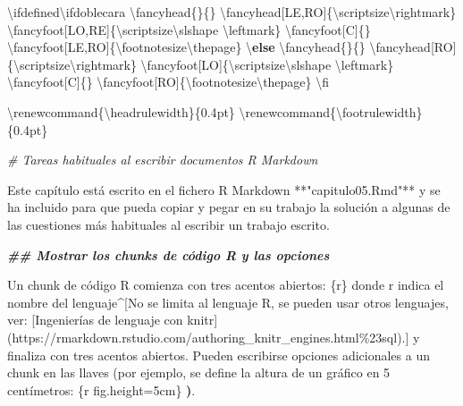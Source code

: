\documentclass[11pt,a4paper,oneside,]{article}
\newenvironment{Shaded}{\begin{snugshade}}{\end{snugshade}}
\newcommand{\AttributeTok}[1]{\textcolor[rgb]{0.77,0.63,0.00}{#1}}
\newcommand{\CommentTok}[1]{\textcolor[rgb]{0.56,0.35,0.01}{\textit{#1}}}
\newcommand{\ControlFlowTok}[1]{\textcolor[rgb]{0.13,0.29,0.53}{\textbf{#1}}}
\newcommand{\DocumentationTok}[1]{\textcolor[rgb]{0.56,0.35,0.01}{\textbf{\textit{#1}}}}
\newcommand{\ErrorTok}[1]{\textcolor[rgb]{0.64,0.00,0.00}{\textbf{#1}}}
\newcommand{\FloatTok}[1]{\textcolor[rgb]{0.00,0.00,0.81}{#1}}
\newcommand{\NormalTok}[1]{#1}
\newcommand{\OtherTok}[1]{\textcolor[rgb]{0.56,0.35,0.01}{#1}}
\newcommand{\SpecialCharTok}[1]{\textcolor[rgb]{0.00,0.00,0.00}{#1}}
\newcommand{\StringTok}[1]{\textcolor[rgb]{0.31,0.60,0.02}{#1}}
\numberwithin{dummy}{section}
\theoremstyle{ocrenumbox}
\theoremstyle{blacknumex}
\theoremstyle{blacknumbox}
\theoremstyle{ocrenum}
\theoremstyle{ocrenum}
\begin{document}
\begin{Shaded}
\begin{Highlighting}[numbers=left,,]
\NormalTok{\textbackslash{}ifdefined\textbackslash{}ifdoblecara}
\NormalTok{\textbackslash{}fancyhead\{\}\{\}}
\NormalTok{\textbackslash{}fancyhead[LE,RO]\{\textbackslash{}scriptsize\textbackslash{}rightmark\}}
\NormalTok{\textbackslash{}fancyfoot[LO,RE]\{\textbackslash{}scriptsize\textbackslash{}slshape \textbackslash{}leftmark\}}
\NormalTok{\textbackslash{}fancyfoot[C]\{\}}
\NormalTok{\textbackslash{}fancyfoot[LE,RO]\{\textbackslash{}footnotesize\textbackslash{}thepage\}}
\NormalTok{\textbackslash{}}\ControlFlowTok{else}
\NormalTok{\textbackslash{}fancyhead\{\}\{\}}
\NormalTok{\textbackslash{}fancyhead[RO]\{\textbackslash{}scriptsize\textbackslash{}rightmark\}}
\NormalTok{\textbackslash{}fancyfoot[LO]\{\textbackslash{}scriptsize\textbackslash{}slshape \textbackslash{}leftmark\}}
\NormalTok{\textbackslash{}fancyfoot[C]\{\}}
\NormalTok{\textbackslash{}fancyfoot[RO]\{\textbackslash{}footnotesize\textbackslash{}thepage\}}
\NormalTok{\textbackslash{}fi}

\NormalTok{\textbackslash{}renewcommand\{\textbackslash{}headrulewidth\}\{}\FloatTok{0.4}\NormalTok{pt\}}
\NormalTok{\textbackslash{}renewcommand\{\textbackslash{}footrulewidth\}\{}\FloatTok{0.4}\NormalTok{pt\}}


\CommentTok{\# Tareas habituales al escribir documentos R Markdown}




\NormalTok{Este capítulo está escrito en el fichero R Markdown }\SpecialCharTok{**}\StringTok{"capitulo05.Rmd"}\SpecialCharTok{**}\NormalTok{ y se ha incluido para }
\NormalTok{que pueda copiar y pegar en su trabajo la solución a algunas de las cuestiones más habituales}
\NormalTok{al escribir un trabajo escrito. }



\DocumentationTok{\#\# Mostrar los chunks de código R y las opciones}


\NormalTok{Un chunk de código R comienza con tres acentos abiertos}\SpecialCharTok{:}  \StringTok{\textasciigrave{}\textasciigrave{}\textasciigrave{}\textasciigrave{}} \StringTok{\textasciigrave{}\textasciigrave{}\textasciigrave{}}\AttributeTok{\{r\} }\StringTok{\textasciigrave{}\textasciigrave{}\textasciigrave{}\textasciigrave{}}\AttributeTok{ donde }\StringTok{\textasciigrave{}}\NormalTok{r}\StringTok{\textasciigrave{}}\AttributeTok{ indica el nombre del lenguaje\^{}[No se limita al lenguaje R, se pueden usar otros lenguajes, ver: [Ingenierías de lenguaje con knitr](https://rmarkdown.rstudio.com/authoring\_knitr\_engines.html\%23sql).] y finaliza con tres acentos abiertos. Pueden escribirse opciones adicionales a un chunk en las llaves (por ejemplo, se define la altura de un gráfico en 5 centímetros: }\StringTok{\textasciigrave{}\textasciigrave{}\textasciigrave{}\textasciigrave{}}\AttributeTok{ }\StringTok{\textasciigrave{}\textasciigrave{}\textasciigrave{}}\NormalTok{\{r fig.height}\OtherTok{=}\StringTok{\textquotesingle{}5cm\textquotesingle{}}\NormalTok{\} }\StringTok{\textasciigrave{}\textasciigrave{}\textasciigrave{}\textasciigrave{}}\ErrorTok{)}\NormalTok{. }


\end{Highlighting}
\end{Shaded}
\end{document}
